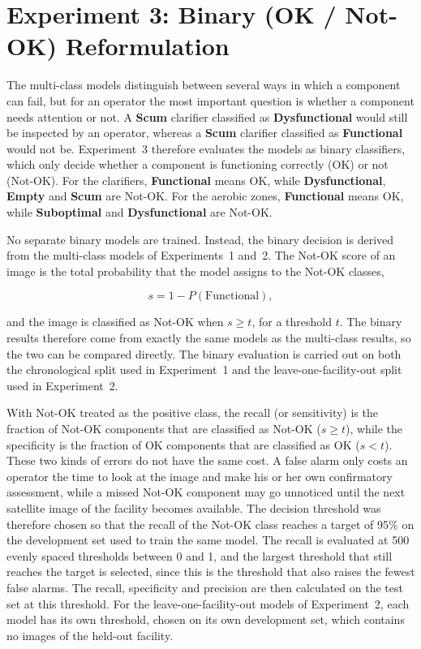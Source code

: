 \section{Experiment 3: Binary (OK / Not-OK) Reformulation}
\label{sec:exp_binary}

The multi-class models distinguish between several ways in which a component can fail, but for an operator the most important question is whether a component needs attention or not. A \textbf{Scum} clarifier classified as \textbf{Dysfunctional} would still be inspected by an operator, whereas a \textbf{Scum} clarifier classified as \textbf{Functional} would not be. Experiment~3 therefore evaluates the models as binary classifiers, which only decide whether a component is functioning correctly (OK) or not (Not-OK). For the clarifiers, \textbf{Functional} means OK, while \textbf{Dysfunctional}, \textbf{Empty} and \textbf{Scum} are Not-OK. For the aerobic zones, \textbf{Functional} means OK, while \textbf{Suboptimal} and \textbf{Dysfunctional} are Not-OK.

No separate binary models are trained. Instead, the binary decision is derived from the multi-class models of Experiments~1 and~2. The Not-OK score of an image is the total probability that the model assigns to the Not-OK classes,

\begin{equation}
    s = 1 - P(\mathrm{Functional}),
\end{equation}

and the image is classified as Not-OK when $s \geq t$, for a threshold $t$. The binary results therefore come from exactly the same models as the multi-class results, so the two can be compared directly. The binary evaluation is carried out on both the chronological split used in Experiment~1 and the leave-one-facility-out split used in Experiment~2.

With Not-OK treated as the positive class, the recall (or sensitivity) is the fraction of Not-OK components that are classified as Not-OK ($s \geq t$), while the specificity is the fraction of OK components that are classified as OK ($s < t$). These two kinds of errors do not have the same cost. A false alarm only costs an operator the time to look at the image and make his or her own confirmatory assessment, while a missed Not-OK component may go unnoticed until the next satellite image of the facility becomes available. The decision threshold was therefore chosen so that the recall of the Not-OK class reaches a target of 95\% on the development set used to train the same model. The recall is evaluated at 500 evenly spaced thresholds between 0 and 1, and the largest threshold that still reaches the target is selected, since this is the threshold that also raises the fewest false alarms. The recall, specificity and precision are then calculated on the test set at this threshold. For the leave-one-facility-out models of Experiment~2, each model has its own threshold, chosen on its own development set, which contains no images of the held-out facility.

